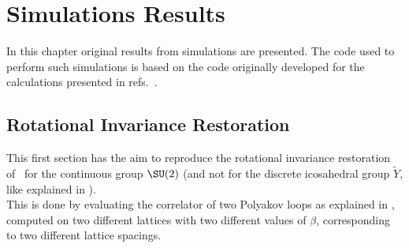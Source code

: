 \pagestyle{myFancy}
\chapter{Simulations Results}
In this chapter original results from simulations are presented.
The code used to perform such simulations is based on the code originally developed for the calculations presented in refs.~\cite{Panero:2009tv,Mykkanen:2012ri}.

\section{Rotational Invariance Restoration}
This first section has the aim to reproduce the rotational invariance restoration of~\cite{Lang:1982tj} for the continuous group $\SU(2)$ (and not for the discrete icosahedral group $\tilde{Y}$, like explained in ).\\
This is done by evaluating the correlator of two Polyakov loops as explained in , computed on two different lattices with two different values of $\beta$, corresponding to two different lattice spacings.

